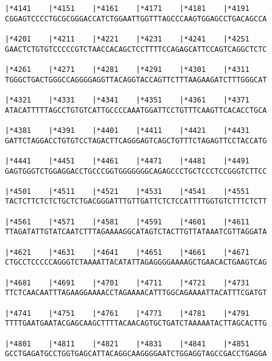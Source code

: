 \documentclass{article}
\begin{document}
\begin{Verbatim}
|*4141    |*4151    |*4161    |*4171    |*4181    |*4191    
CGGAGTCCCCTGCGCGGGACCATCTGGAATTGGTTTAGCCCAAGTGGAGCCTGACAGCCA
                                                            
|*4201    |*4211    |*4221    |*4231    |*4241    |*4251    
GAACTCTGTGTCCCCCGTCTAACCACAGCTCCTTTTCCAGAGCATTCCAGTCAGGCTCTC
                                                            
|*4261    |*4271    |*4281    |*4291    |*4301    |*4311    
TGGGCTGACTGGGCCAGGGGAGGTTACAGGTACCAGTTCTTTAAGAAGATCTTTGGGCAT
                                                            
|*4321    |*4331    |*4341    |*4351    |*4361    |*4371    
ATACATTTTTAGCCTGTGTCATTGCCCCAAATGGATTCCTGTTTCAAGTTCACACCTGCA
                                                            
|*4381    |*4391    |*4401    |*4411    |*4421    |*4431    
GATTCTAGGACCTGTGTCCTAGACTTCAGGGAGTCAGCTGTTTCTAGAGTTCCTACCATG
                                                            
|*4441    |*4451    |*4461    |*4471    |*4481    |*4491    
GAGTGGGTCTGGAGGACCTGCCCGGTGGGGGGGCAGAGCCCTGCTCCCTCCGGGTCTTCC
                                                            
|*4501    |*4511    |*4521    |*4531    |*4541    |*4551    
TACTCTTCTCTCTGCTCTGACGGGATTTGTTGATTCTCTCCATTTTGGTGTCTTTCTCTT
                                                            
|*4561    |*4571    |*4581    |*4591    |*4601    |*4611    
TTAGATATTGTATCAATCTTTAGAAAAGGCATAGTCTACTTGTTATAAATCGTTAGGATA
                                                            
|*4621    |*4631    |*4641    |*4651    |*4661    |*4671    
CTGCCTCCCCCAGGGTCTAAAATTACATATTAGAGGGGAAAAGCTGAACACTGAAGTCAG
                                                            
|*4681    |*4691    |*4701    |*4711    |*4721    |*4731    
TTCTCAACAATTTAGAAGGAAAACCTAGAAAACATTTGGCAGAAAATTACATTTCGATGT
                                                            
|*4741    |*4751    |*4761    |*4771    |*4781    |*4791    
TTTTGAATGAATACGAGCAAGCTTTTACAACAGTGCTGATCTAAAAATACTTAGCACTTG
                                                            
|*4801    |*4811    |*4821    |*4831    |*4841    |*4851    
GCCTGAGATGCCTGGTGAGCATTACAGGCAAGGGGAATCTGGAGGTAGCCGACCTGAGGA
                                                            

\end{Verbatim}
\end{document}
